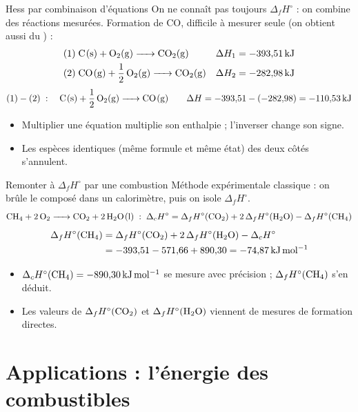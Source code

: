 \documentclass[aspectratio=169,10pt]{beamer}
\newcommand{\dfH}{\Delta_{f}H^{\circ}}
\newcommand{\dcH}{\Delta_{c}H^{\circ}}
\newcommand{\kJ}{\ensuremath{\,\mathrm{kJ}}}
\newcommand{\kJmol}{\ensuremath{\,\mathrm{kJ\,mol^{-1}}}}
\begin{document}
\begin{frame}{Hess par combinaison d'équations}
  On ne connaît pas toujours $\dfH$ : on combine des réactions mesurées.
  Formation de CO, difficile à mesurer seule (on obtient aussi du ) :
  \begin{align*}
    (1)\;& \ce{C(s) + O2(g) -> CO2(g)} & \Delta H_1 &= -393{,}51\kJ\\
    (2)\;& \ce{CO(g) + 1/2 O2(g) -> CO2(g)} & \Delta H_2 &= -282{,}98\kJ
  \end{align*}
  \[
    (1) - (2)\;:\quad \ce{C(s) + 1/2 O2(g) -> CO(g)}
    \qquad \Delta H = -393{,}51 - (-282{,}98) = -110{,}53\kJ
  \]
  \vspace{-1mm}
  \begin{itemize}
    \item Multiplier une équation multiplie son enthalpie ; l'inverser change son signe.
    \item Les espèces identiques (même formule et même état) des deux côtés
      s'annulent.
  \end{itemize}
\end{frame}

\begin{frame}{Remonter à $\dfH$ par une combustion}
  Méthode expérimentale classique : on brûle le composé dans un calorimètre,
  puis on isole $\dfH$.
  \[
    \ce{CH4 + 2 O2 -> CO2 + 2 H2O(l)} \;:\;
    \dcH = \dfH(\ce{CO2}) + 2\,\dfH(\ce{H2O}) - \dfH(\ce{CH4})
  \]
  \begin{align*}
    \dfH(\ce{CH4}) &= \dfH(\ce{CO2}) + 2\,\dfH(\ce{H2O}) - \dcH\\
      &= -393{,}51 - 571{,}66 + 890{,}30 = -74{,}87\kJmol
  \end{align*}
  \vspace{1mm}
  \begin{itemize}
    \item $\dcH(\ce{CH4}) = -890{,}30\kJmol$ se mesure avec précision ;
      $\dfH(\ce{CH4})$ s'en déduit.
    \item Les valeurs de $\dfH(\ce{CO2})$ et $\dfH(\ce{H2O})$ viennent de mesures
      de formation directes.
  \end{itemize}
\end{frame}

\section{Applications : l'énergie des combustibles}
\end{document}

